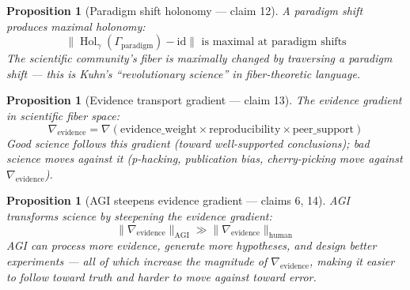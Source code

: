 \documentclass[11pt,a4paper]{article}
\newtheorem{proposition}[definition]{Proposition}
\begin{document}
\begin{proposition}[Paradigm shift holonomy --- claim 12]
\label{prop:holonomy}
A paradigm shift produces maximal holonomy:
\[
  \|\operatorname{Hol}_\gamma(\Gamma_{\text{paradigm}}) - \mathrm{id}\|
  \text{ is maximal at paradigm shifts}
\]
The scientific community's fiber is maximally changed by traversing
a paradigm shift --- this is Kuhn's ``revolutionary science'' in
fiber-theoretic language.
\end{proposition}

\begin{proposition}[Evidence transport gradient --- claim 13]
\label{prop:gradient}
The evidence gradient in scientific fiber space:
\[
  \nabla_{\text{evidence}} = \nabla\left(\text{evidence\_weight} \times
    \text{reproducibility} \times \text{peer\_support}\right)
\]
Good science follows this gradient (toward well-supported conclusions);
bad science moves against it (p-hacking, publication bias, cherry-picking
move against $\nabla_{\text{evidence}}$).
\end{proposition}

\begin{proposition}[AGI steepens evidence gradient --- claims 6, 14]
\label{prop:agi}
AGI transforms science by steepening the evidence gradient:
\[
  \|\nabla_{\text{evidence}}\|_{\text{AGI}} \gg
    \|\nabla_{\text{evidence}}\|_{\text{human}}
\]
AGI can process more evidence, generate more hypotheses, and design
better experiments --- all of which increase the magnitude of
$\nabla_{\text{evidence}}$, making it easier to follow toward truth
and harder to move against toward error.
\end{proposition}
\end{document}
